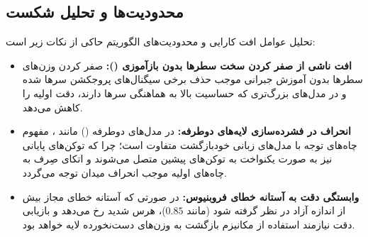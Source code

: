 \subsection{محدودیت‌ها و تحلیل شکست}
تحلیل عوامل افت کارایی و محدودیت‌های الگوریتم حاکی از نکات زیر است:
\begin{itemize}
    \item \textbf{افت ناشی از صفر کردن سخت سطرها بدون بازآموزی ():} صفر کردن وزن‌های سطرها بدون آموزش جبرانی موجب حذف برخی سیگنال‌های پروجکشن سرها شده و در مدل‌های بزرگ‌تری که حساسیت بالا به هماهنگی سرها دارند، دقت اولیه را کاهش می‌دهد.
    \item \textbf{انحراف در فشرده‌سازی لایه‌های دوطرفه:} در مدل‌های دوطرفه () مانند ، مفهوم چاه‌های توجه با مدل‌های زبانی خودبازگشت متفاوت است؛ چرا که توکن‌های پایانی نیز به صورت یکنواخت به توکن‌های پیشین متصل می‌شوند و اتکای صِرف به چاه‌های اولیه موجب انحراف میدان توجه می‌گردد.
    \item \textbf{وابستگی دقت به آستانه خطای فروبنیوس:} در صورتی که آستانه خطای مجاز بیش از اندازه آزاد در نظر گرفته شود (مانند $0.85$)، هرس شدید رخ می‌دهد و بازیابی دقت نیازمند استفاده از مکانیزم بازگشت به وزن‌های دست‌نخورده لایه خواهد بود.
\end{itemize}
